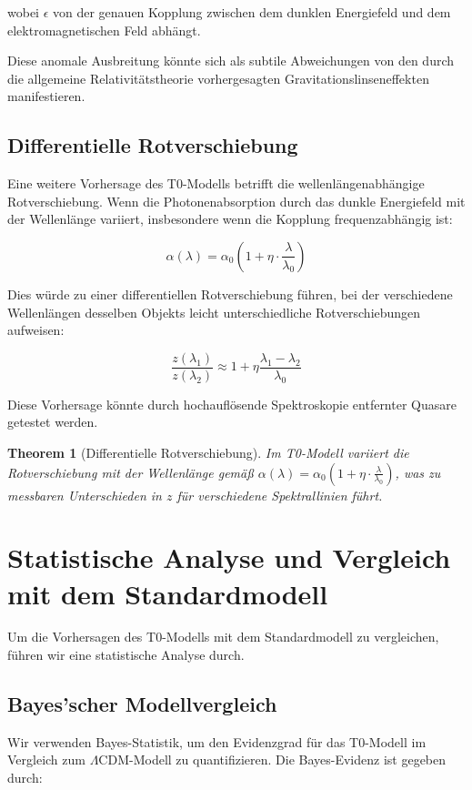 \documentclass[a4paper,12pt]{article}
\newtheorem{theorem}{Theorem}[section]
\theoremstyle{definition}
\theoremstyle{remark}
\begin{document}
	wobei $\epsilon$ von der genauen Kopplung zwischen dem dunklen Energiefeld und dem elektromagnetischen Feld abhängt.
	
	Diese anomale Ausbreitung könnte sich als subtile Abweichungen von den durch die allgemeine Relativitätstheorie vorhergesagten Gravitationslinseneffekten manifestieren.
	
	\subsection{Differentielle Rotverschiebung}
	Eine weitere Vorhersage des T0-Modells betrifft die wellenlängenabhängige Rotverschiebung. Wenn die Photonenabsorption durch das dunkle Energiefeld mit der Wellenlänge variiert, insbesondere wenn die Kopplung frequenzabhängig ist:
	
	\begin{equation}
		\alpha(\lambda) = \alpha_0 \left(1 + \eta \cdot \frac{\lambda}{\lambda_0}\right)
	\end{equation}
	
	Dies würde zu einer differentiellen Rotverschiebung führen, bei der verschiedene Wellenlängen desselben Objekts leicht unterschiedliche Rotverschiebungen aufweisen:
	
	\begin{equation}
		\frac{z(\lambda_1)}{z(\lambda_2)} \approx 1 + \eta\frac{\lambda_1 - \lambda_2}{\lambda_0}
	\end{equation}
	
	Diese Vorhersage könnte durch hochauflösende Spektroskopie entfernter Quasare getestet werden.
	
	\begin{theorem}[Differentielle Rotverschiebung]
		Im T0-Modell variiert die Rotverschiebung mit der Wellenlänge gemäß $\alpha(\lambda) = \alpha_0 \left(1 + \eta \cdot \frac{\lambda}{\lambda_0}\right)$, was zu messbaren Unterschieden in $z$ für verschiedene Spektrallinien führt.
	\end{theorem}
	
	\section{Statistische Analyse und Vergleich mit dem Standardmodell}
	Um die Vorhersagen des T0-Modells mit dem Standardmodell zu vergleichen, führen wir eine statistische Analyse durch.
	
	\subsection{Bayes’scher Modellvergleich}
	Wir verwenden Bayes-Statistik, um den Evidenzgrad für das T0-Modell im Vergleich zum $\Lambda$CDM-Modell zu quantifizieren. Die Bayes-Evidenz ist gegeben durch:
	
\end{document}
